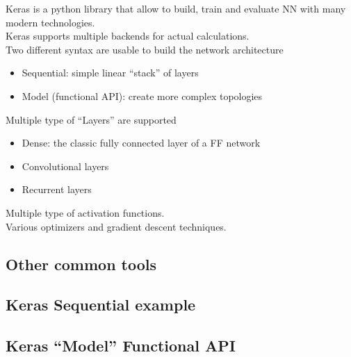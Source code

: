 Keras is a python library that allow to build, train and evaluate NN with many modern technologies.\\
Keras supports multiple backends for actual calculations.\\
Two different syntax are usable to build the network architecture
\begin{itemize}
	\item Sequential: simple linear “stack” of layers
	\item Model (functional API): create more complex topologies
\end{itemize}

Multiple type of “Layers” are supported

\begin{itemize}
	\item Dense: the classic fully connected layer of a FF network
	\item Convolutional layers
	\item Recurrent layers
\end{itemize}

Multiple type of activation functions.\\
Various optimizers and gradient descent techniques.

\subsection{Other common tools}
\subsection{Keras Sequential example}
\subsection{Keras “Model” Functional API}